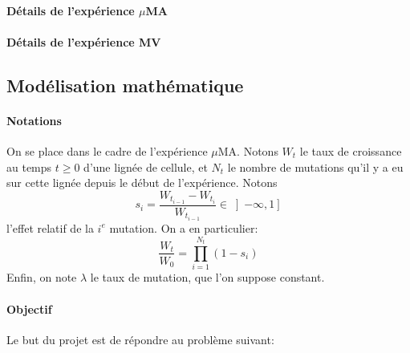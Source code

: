\documentclass[12pt]{article}
\newcommand{\iof}[1]{\left]#1\right]}
\begin{document}
\paragraph{Détails de l'expérience $\mu$MA}



\paragraph{Détails de l'expérience MV}



\subsection{Modélisation mathématique}

\paragraph{Notations}
On se place dans le cadre de l'expérience $\mu$MA. Notons $W_t$ le taux de croissance au temps $t\geqslant 0$ d'une lignée de cellule, et $N_t$ le nombre de mutations qu'il y a eu sur cette lignée depuis le début de l'expérience. Notons \[s_i=\frac{W_{t_{i-1}}-W_{t_i}}{W_{t_{i-1}}}\in\iof{-\infty,1}\] l'effet relatif de la $i^e$ mutation. On a en particulier: 
\begin{equation}\label{mod}
  \frac{W_t}{W_0}=\prod_{i=1}^{N_t}(1-s_i)
\end{equation}
Enfin, on note $\lambda$ le taux de mutation, que l'on suppose constant.

\paragraph{Objectif} Le but du projet est de répondre au problème suivant:

\end{document}
